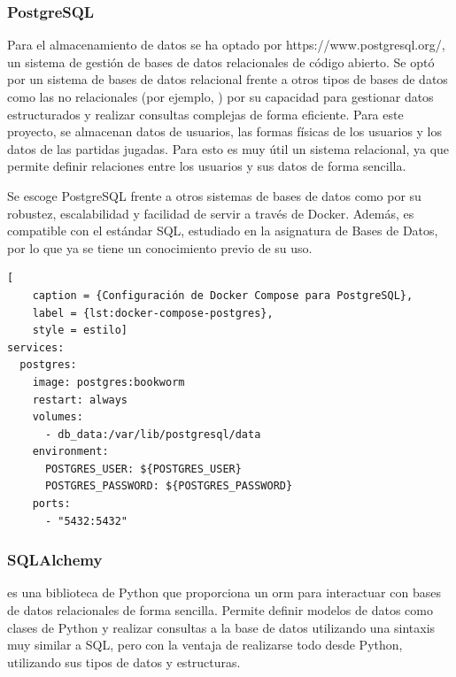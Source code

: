 \subsubsection{PostgreSQL}
\label{c08:subsubsec:postgresql}
Para el almacenamiento de datos se ha optado por 
{https://www.postgresql.org/}, un sistema de gestión de bases de datos
relacionales de código abierto. Se optó por un sistema de bases de datos
relacional frente a otros tipos de bases de datos como las no relacionales (por
ejemplo, ) por su capacidad para
gestionar datos estructurados y realizar consultas complejas de forma eficiente.
Para este proyecto, se almacenan datos de usuarios, las formas físicas de los
usuarios y los datos de las partidas jugadas. Para esto es muy útil un sistema
relacional, ya que permite definir relaciones entre los usuarios y sus datos de
forma sencilla.

Se escoge PostgreSQL frente a otros sistemas de bases de datos como
 por su robustez, escalabilidad y facilidad
de servir a través de Docker. Además, es compatible con el estándar SQL,
estudiado en la asignatura de Bases de Datos, por lo que ya se tiene un
conocimiento previo de su uso.

\begin{lstlisting}[
    caption = {Configuración de Docker Compose para PostgreSQL},
    label = {lst:docker-compose-postgres},
    style = estilo]
services:
  postgres:
    image: postgres:bookworm
    restart: always
    volumes:
      - db_data:/var/lib/postgresql/data
    environment:
      POSTGRES_USER: ${POSTGRES_USER}
      POSTGRES_PASSWORD: ${POSTGRES_PASSWORD}
    ports:
      - "5432:5432"
\end{lstlisting}

\subsubsection{SQLAlchemy}
\label{c08:subsubsec:sqlalchemy}
 es una biblioteca de Python que proporciona un \gls{orm}
para interactuar con bases de datos relacionales de forma sencilla. Permite definir modelos de datos
como clases de Python y realizar consultas a la base de datos utilizando una sintaxis muy similar a SQL, pero
con la ventaja de realizarse todo desde Python, utilizando sus tipos de datos y estructuras.

